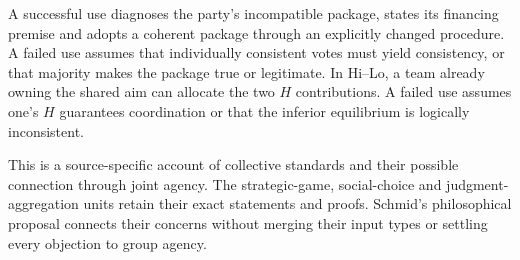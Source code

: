 A successful use diagnoses the party's incompatible package, states its
financing premise and adopts a coherent package through an explicitly
changed procedure. A failed use assumes that individually consistent
votes must yield consistency, or that majority makes the package true or
legitimate. In Hi--Lo, a team already owning the shared aim can allocate
the two \(H\) contributions. A failed use assumes one's \(H\) guarantees
coordination or that the inferior equilibrium is logically inconsistent.

This is a source-specific account of collective standards and their possible
connection through joint agency. The strategic-game, social-choice and
judgment-aggregation units retain their exact statements and proofs.
Schmid's philosophical proposal connects their concerns without merging
their input types or settling every objection to group agency.

